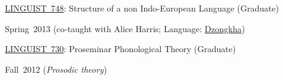 \documentclass[10pt]{article}
\newcommand{\halfblankline}{\quad\vspace{-0.5\baselineskip}\pagebreak[3]}
\begin{document}
\begin{outerlist}
\begin{innerlist}
        \halfblankline

        \item \href{http://www.umass.edu/linguist/courses/detail.php?cid=481}{LINGUIST~748}:
          Structure of a non Indo-European Language (Graduate)
        \begin{innerlist}[\enskip$\circ$,leftmargin=*]
            \item Spring~2013 (co-taught with Alice Harris; Language: \href{http://www.ethnologue.com/language/dzo}{Dzongkha})
        \end{innerlist}

        \halfblankline

        \item \href{http://www.umass.edu/linguist/courses/detail.php?cid=427}{LINGUIST~730}:
          Proseminar Phonological Theory (Graduate)
        \begin{innerlist}[\enskip$\circ$,leftmargin=*]
            \item Fall~2012 (\emph{Prosodic theory})
        \end{innerlist}

    \end{innerlist}

\end{outerlist}

\halfblankline
\end{document}
